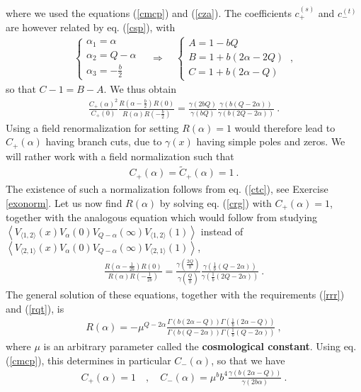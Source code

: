 \documentclass[12pt,a4paper,notitlepage]{report}
\newcommand \la {\left\langle}
\newcommand \ra {\right\rangle}
\newcommand \bla {\left\{\begin{array}{l} }
\newcommand \ela {\end{array}\right. }
\numberwithin{equation}{section}
\theoremstyle{break}
\begin{document}
where we used the equations (\ref{cmcp}) and (\ref{cza}). The coefficients $c^{(s)}_+$ and $c^{(t)}_-$ are however related by eq. (\ref{csp}), with
\begin{align}
 \bla \alpha_1 = \alpha \\ \alpha_2 = Q-\alpha \\ \alpha_3 = -\frac{b}{2} \ela\quad \Rightarrow \quad \bla A = 1-bQ \\ B = 1+b(2\alpha-2Q) \\ C=1+b(2\alpha-Q) \ela \ ,
\end{align}
so that $C-1=B-A$. We thus obtain
\begin{align}
 \frac{C_+(\alpha)^2}{C_+(0)} \frac{R(\alpha-\tfrac{b}{2})R(0)}{R(\alpha)R(-\tfrac{b}{2})} = 
\frac{\gamma(2bQ)}{\gamma(bQ)} \frac{\gamma(b(Q-2\alpha))}{\gamma(b(2Q-2\alpha))}\ .
\label{crg}
\end{align}
Using a field renormalization for setting $R(\alpha)=1$ would therefore lead to $C_+(\alpha)$ having branch cuts, due to $\gamma(x)$ having simple poles and zeros. We will rather work with a field normalization such that  
\begin{align}
 \boxed{C_+(\alpha) = \tilde{C}_+(\alpha) = 1}\ . 
\label{cco}
\end{align}
The existence of such a normalization follows from eq. (\ref{ctc}), see Exercise \ref{exonorm}.
Let us now find $R(\alpha)$ by solving eq. (\ref{crg}) with $C_+(\alpha)=1$, together with the analogous equation which would follow from studying $ \la V_{\langle 1,2 \rangle}(x) V_\alpha(0) V_{Q-\alpha}(\infty) V_{\langle 1,2 \rangle}(1)\ra$ instead of $\la V_{\langle 2,1 \rangle}(x) V_\alpha(0) V_{Q-\alpha}(\infty) V_{\langle 2,1 \rangle}(1)\ra$, 
\begin{align}
  \frac{R(\alpha-\tfrac{1}{2b})R(0)}{R(\alpha)R(-\tfrac{1}{2b})} = \frac{\gamma(\frac{2Q}{b})}{\gamma(\frac{Q}{b})} \frac{\gamma(\frac{1}{b}(Q-2\alpha))}{\gamma(\frac{1}{b}(2Q-2\alpha))}\ .
\end{align}
The general solution of these equations, together with the requirements (\ref{rrr}) and (\ref{rqt}), is
\begin{align}
 \boxed{R(\alpha) = -\mu^{Q-2\alpha} \frac{\Gamma(b(2\alpha-Q))\Gamma(\frac{1}{b}(2\alpha-Q))}{\Gamma(b(Q-2\alpha))\Gamma(\frac{1}{b}(Q-2\alpha))}}\ ,
\label{ram}
\end{align}
where $\mu$ is an arbitrary parameter called the \textbf{\boldmath cosmological constant}. Using eq. (\ref{cmcp}), this determines in particular $C_-(\alpha)$, so that we have
\begin{align}
 C_+(\alpha)=1 \quad , \quad C_-(\alpha) = \mu^b b^4 \frac{\gamma(b(2\alpha-Q))}{\gamma(2b\alpha)}\ .
\label{cpm}
\end{align}
\end{document}
